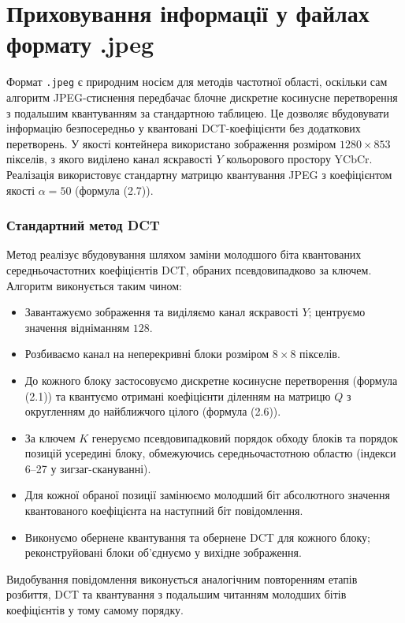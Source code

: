\section{Приховування інформації у файлах формату .jpeg}

Формат \texttt{.jpeg} є природним носієм для методів частотної області,
оскільки сам алгоритм JPEG-стиснення передбачає блочне дискретне косинусне
перетворення з подальшим квантуванням за стандартною таблицею. Це дозволяє
вбудовувати інформацію безпосередньо у квантовані DCT-коефіцієнти без
додаткових перетворень. У якості контейнера використано зображення розміром
$1280 \times 853$ пікселів, з якого виділено канал яскравості $Y$ кольорового
простору $\mathrm{YCbCr}$. Реалізація використовує стандартну матрицю
квантування JPEG з коефіцієнтом якості $\alpha = 50$ (формула (2.7)).

\subsubsection*{Стандартний метод DCT}

Метод реалізує вбудовування шляхом заміни молодшого біта квантованих
середньочастотних коефіцієнтів DCT, обраних псевдовипадково за ключем.
Алгоритм виконується таким чином:
\begin{itemize}
    \item Завантажуємо зображення та виділяємо канал яскравості $Y$;
    центруємо значення відніманням $128$.
    \item Розбиваємо канал на неперекривні блоки розміром $8 \times 8$
    пікселів.
    \item До кожного блоку застосовуємо дискретне косинусне перетворення
    (формула (2.1)) та квантуємо отримані коефіцієнти діленням на матрицю
    $Q$ з округленням до найближчого цілого (формула (2.6)).
    \item За ключем $K$ генеруємо псевдовипадковий порядок обходу блоків та
    порядок позицій усередині блоку, обмежуючись середньочастотною областю
    (індекси 6--27 у зигзаг-скануванні).
    \item Для кожної обраної позиції замінюємо молодший біт абсолютного
    значення квантованого коефіцієнта на наступний біт повідомлення.
    \item Виконуємо обернене квантування та обернене DCT для кожного блоку;
    реконструйовані блоки об'єднуємо у вихідне зображення.
\end{itemize}
Видобування повідомлення виконується аналогічним повторенням етапів
розбиття, DCT та квантування з подальшим читанням молодших бітів коефіцієнтів
у тому самому порядку.

